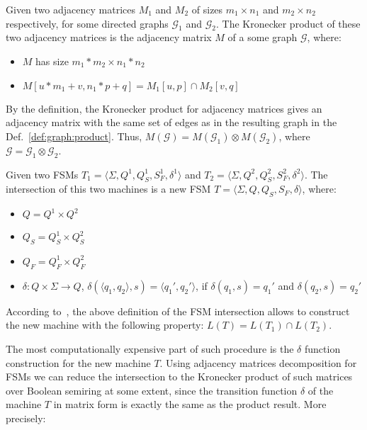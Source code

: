 \begin{definition}
Given two adjacency matrices $M_1$ and $M_2$ of  sizes $m_1 \times n_1$ and $m_2 \times n_2$ respectively, for some directed graphs $\mathcal{G}_1$ and $\mathcal{G}_2$. 
The Kronecker product of these two adjacency matrices is the adjacency matrix $M$ of a some graph $\mathcal{G}$, where:
\begin{itemize}
    \item $M$ has size $m_1 * m_2 \times n_1 * n_2$
    \item $M[u * m_1 + v,n_1 * p + q] = M_1[u,p] \cap M_2[v,q]$
\end{itemize}
\end{definition}

By the definition, the Kronecker product for adjacency matrices gives an adjacency matrix with the same set of edges as in the resulting graph in the Def.~\ref{def:graph:product}.
Thus, $M(\mathcal{G}) = M(\mathcal{G}_1) \otimes M(\mathcal{G}_2)$, where $\mathcal{G} = \mathcal{G}_1 \otimes \mathcal{G}_2$.

\begin{definition}
\label{def:fsm:intersection}
Given two FSMs $T_1 = \langle \Sigma, Q^1, Q_S^1, S_F^1, \delta^1 \rangle$ and $T_2 = \langle \Sigma, Q^2, Q_S^2, S_F^2, \delta^2 \rangle$. The intersection of this two machines is a new FSM $T = \langle \Sigma, Q, Q_S, S_F, \delta \rangle$, where:
\begin{itemize}
    \item $Q = Q^1 \times Q^2$
    \item $Q_S = Q_S^1 \times Q_S^2$
    \item $Q_F = Q_F^1 \times Q_F^2$
    \item $\delta: Q \times \Sigma \to Q$, 
    $\delta (\langle q_1, q_2 \rangle, s) = \langle q_1', q_2' \rangle$, 
    \newline if $\delta(q_1,s)=q_1'$ and $\delta(q_2,s)=q_2'$
\end{itemize}
\end{definition}

According to~\cite{automata:theory:10.5555/1177300}, the above definition of the FSM intersection allows to construct the new machine with the following property: $L(T) = L(T_1) \cap L(T_2)$. 

The most computationally expensive part of such procedure is the $\delta$ function construction for the new machine $T$. Using adjacency matrices decomposition for FSMs we can reduce the intersection to the Kronecker product of such matrices over Boolean semiring at some extent, since the transition function $\delta$ of the machine $T$ in matrix form is exactly the same as the product result. More precisely:

